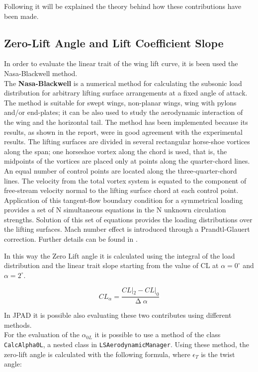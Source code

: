 Following it will be explained the theory behind how these contributions have been made.

\subsection{Zero-Lift Angle and Lift Coefficient Slope}

In order to evaluate the linear trait of the wing lift curve, it is been used the Nasa-Blackwell method.\\ The {\bfseries Nasa-Blackwell} is a numerical method for calculating the subsonic load distribution for arbitrary lifting surface arrangements at a fixed angle of attack. The method is suitable for swept wings, non-planar wings, wing with pylons and/or end-plates; it can be also used to study the aerodynamic interaction of the wing and the horizontal tail. The method has been implemented because its results, as shown in the report, were in good agreement with the experimental results.
The lifting surfaces are divided in several rectangular horse-shoe vortices along the span; one horseshoe vortex along the chord is used, that is, the midpoints of the vortices are placed only at points along the quarter-chord lines. An equal number of control points are located along the three-quarter-chord lines. The velocity from the total vortex system is equated to the component of free-stream velocity normal to the lifting surface chord at each control point. Application of this tangent-flow boundary condition for a symmetrical loading provides a set of N simultaneous equations in the N unknown circulation strengths. Solution of this set of equations provides the loading distributions over the lifting surfaces. Mach number effect is introduced through a Prandtl-Glauert correction. Further details can be found in \cite{NASA:Blackwell}.

In this way  the Zero Lift angle it is calculated using the integral of the load distribution and the linear trait slope starting from the value of CL at $\alpha =  0^{\circ}$ and $\alpha = 2^{\circ}$.

\begin{equation}
CL_{\alpha}= \frac{CL|_2 - CL|_0}{\upDelta \alpha}
\end{equation}

In JPAD it is possible also evaluating these two contributes using different methods. \\
For the evaluation of the $\alpha_{0L}$ it is possible to use a method of the class \texttt{CalcAlpha0L}, a nested class  in \texttt{LSAerodynamicManager}. Using these method, the zero-lift angle is calculated with the following formula, where $\epsilon_T$ is the twist angle:

